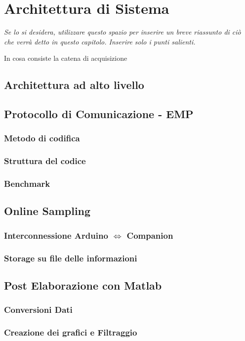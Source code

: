 \chapter{Architettura di Sistema}\label{Catena di Acquisizione}

\begin{minipage}{12cm}\textit{Se lo si desidera, utilizzare questo spazio per inserire un breve riassunto di ci\`o che verr\`a detto in questo capitolo. Inserire solo i punti salienti.}
\end{minipage}

\vspace*{1cm}

In cosa consiste la catena di acquisizione
\section{Architettura ad alto livello}

\section{Protocollo di Comunicazione - EMP}\label{EMP}
\subsection{Metodo di codifica}
\subsection{Struttura del codice}
\subsection{Benchmark}

\section{Online Sampling}
\subsection{Interconnessione Arduino $\Leftrightarrow$ Companion}
\subsection{Storage su file delle informazioni}


\section{Post Elaborazione con Matlab}
\subsection{Conversioni Dati}
\subsection{Creazione dei grafici e Filtraggio}
